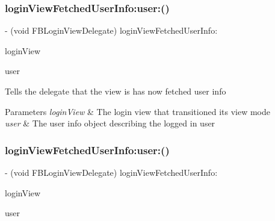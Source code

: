 \subsubsection{\texorpdfstring{login\+View\+Fetched\+User\+Info\+:user\+:()}{loginViewFetchedUserInfo:user:()}\hspace{0.1cm}{\footnotesize\ttfamily [1/5]}}
{\footnotesize\ttfamily -\/ (void F\+B\+Login\+View\+Delegate) login\+View\+Fetched\+User\+Info\+: \begin{DoxyParamCaption}\item[{(\hyperlink{interfaceFBLoginView}{F\+B\+Login\+View} $\ast$)}]{login\+View }\item[{user:(id$<$ \hyperlink{protocolFBGraphUser-p}{F\+B\+Graph\+User} $>$)}]{user }\end{DoxyParamCaption}\hspace{0.3cm}{\ttfamily [optional]}}

Tells the delegate that the view is has now fetched user info


\begin{DoxyParams}{Parameters}
{\em login\+View} & The login view that transitioned its view mode\\
\hline
{\em user} & The user info object describing the logged in user \\
\hline
\end{DoxyParams}
\mbox{\label{protocolFBLoginViewDelegate_01-p_a6dfcb82e159aa83b726797ec2de6877c}} 
\subsubsection{\texorpdfstring{login\+View\+Fetched\+User\+Info\+:user\+:()}{loginViewFetchedUserInfo:user:()}\hspace{0.1cm}{\footnotesize\ttfamily [2/5]}}
{\footnotesize\ttfamily -\/ (void F\+B\+Login\+View\+Delegate) login\+View\+Fetched\+User\+Info\+: \begin{DoxyParamCaption}\item[{(\hyperlink{interfaceFBLoginView}{F\+B\+Login\+View} $\ast$)}]{login\+View }\item[{user:(id$<$ \hyperlink{protocolFBGraphUser-p}{F\+B\+Graph\+User} $>$)}]{user }\end{DoxyParamCaption}\hspace{0.3cm}{\ttfamily [optional]}}

